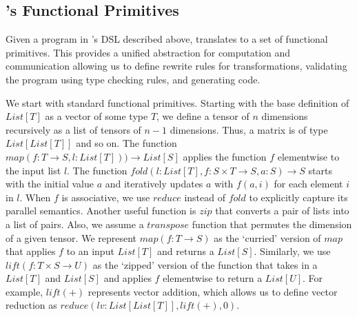 


\iffalse
\subsection{\tool's Functional Primitives}
\label{sec:functional-prmitives}
\newcommand{\List}[1]{\textit{List}[#1]}
\newcommand{\RepList}[1]{\textit{RepList}[#1]} 
\newcommand{\SlicedList}[1]{\textit{SlicedList}[#1]}
\newcommand{\LocList}[2]{\textit{LocList}_{#2}[#1]}
\newcommand{\func}[2]{#1 \rightarrow #2}
\newcommand{\lift}{\textit{lift}}
\newcommand{\funcdef}[3]{#1(#2) \rightarrow #3}

Given a program in \tool's DSL described above, \tool translates to a set of functional primitives. This provides a unified abstraction for computation and communication allowing us to define rewrite rules for transformations, validating the program using type checking rules, and generating code. 

We start with standard functional primitives. Starting with the base definition of $\List{T}$ as a vector of some type $T$, we define a tensor of $n$ dimensions recursively as a list of tensors of $n-1$ dimensions. Thus, a matrix is of type $\List{\List{T}}$ and so on. 
The function $\funcdef{map}{f:\func{T}{S}, l:\List{T})}{\List{S}}$ applies the function $f$ elementwise to the input list $l$. 
The function $\funcdef{fold}{l:\List{T}, f:\func{S\times T}{S}, a:S}{S}$ starts with the initial value $a$ and iteratively updates $a$ with $f(a,i)$ for each element $i$ in $l$. When $f$ is associative, we use $reduce$ instead of $fold$ to explicitly capture its parallel semantics.
 Another useful function is $zip$ that converts a pair of lists into a list of pairs. Also, we assume a $transpose$ function that permutes the dimension of a given tensor.   
We represent $map(f:\func{T}{S})$ as the `curried' version of $map$ that applies $f$ to an input $\List{T}$ and returns a $\List{S}$. Similarly, we use $\lift(f:\func{T\times S}{U})$ as the `zipped' version of the function that takes in a $\List{T}$ and $\List{S}$ and applies $f$ elementwise to return a $\List{U}$. For example, $\lift(+)$ represents vector addition, which allows us to define vector reduction as $reduce(lv: \List{\List{T}}, \lift(+), 0)$.

